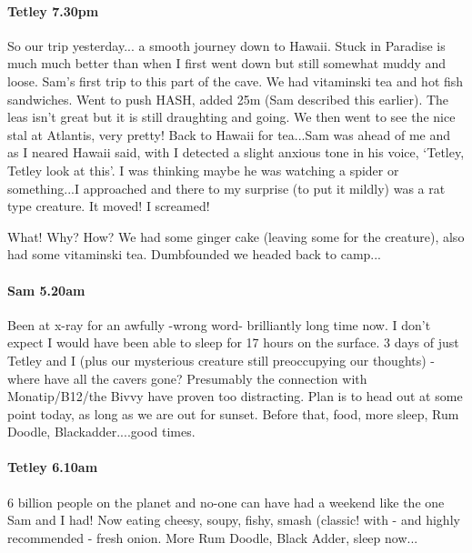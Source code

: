 \paragraph{Tetley 7.30pm}

So our trip yesterday... a smooth journey down to Hawaii. Stuck in Paradise is much much better than when I first went down but still somewhat muddy and loose. Sam's first trip to this part of the cave. We had vitaminski tea and hot fish sandwiches. Went to push HASH, added 25m (Sam described this earlier). The leas isn't great but it is still draughting and going. We then went to see the nice stal at Atlantis, very pretty! Back to Hawaii for tea...Sam was ahead of me and as I neared Hawaii said, with I detected a slight anxious tone in his voice, `Tetley, Tetley look at this'. I was thinking maybe he was watching a spider or something...I approached and there to my surprise (to put it mildly) was a rat type creature. It moved! I screamed!

What! Why? How? We had some ginger cake (leaving some for the creature), also had some vitaminski tea. Dumbfounded we headed back to camp...

\paragraph{Sam 5.20am}
Been at x-ray for an awfully -wrong word- brilliantly long time now. I don't expect I would have been able to sleep for 17 hours on the surface. 3 days of just Tetley and I (plus our mysterious creature still preoccupying our thoughts) - where have all the cavers gone? Presumably the connection with Monatip/B12/the Bivvy have proven too distracting. Plan is to head out at some point today, as long as we are out for sunset. Before that, food, more sleep, Rum Doodle, Blackadder....good times.

\paragraph{Tetley 6.10am}
6 billion people on the planet and no-one can have had a weekend like the one Sam and I had! Now eating cheesy, soupy, fishy, smash (classic! with - and highly recommended - fresh onion. More Rum Doodle, Black Adder, sleep now...

